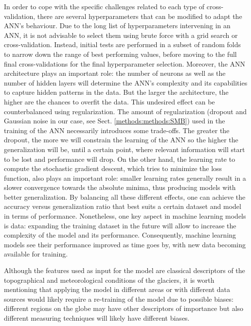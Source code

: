 In order to cope with the specific challenges related to each type of cross-validation, there are several hyperparameters that can be modified to adapt the ANN’s behaviour. Due to the long list of hyperparameters intervening in an ANN, it is not advisable to select them using brute force with a grid search or cross-validation. Instead, initial tests are performed in a subset of random folds to narrow down the range of best performing values, before moving to the full final cross-validations for the final hyperparameter selection. Moreover, the ANN architecture plays an important role: the number of neurons as well as the number of hidden layers will determine the ANN’s complexity and its capabilities to capture hidden patterns in the data. But the larger the architecture, the higher are the chances to overfit the data. This undesired effect can be counterbalanced using regularization. The amount of regularization (dropout and Gaussian noise in our case, see Sect. \ref{methods:methods:SMB}) used in the training of the ANN necessarily introduces some trade-offs. The greater the dropout, the more we will constrain the learning of the ANN so the higher the generalization will be, until a certain point, where relevant information will start to be lost and performance will drop. On the other hand, the learning rate to compute the stochastic gradient descent, which tries to minimize the loss function, also plays an important role: smaller learning rates generally result in a slower convergence towards the absolute minima, thus producing models with better generalization. By balancing all these different effects, one can achieve the accuracy versus generalization ratio that best suits a certain dataset and model in terms of performance. Nonetheless, one key aspect in machine learning models is data: expanding the training dataset in the future will allow to increase the complexity of the model and its performance. Consequently, machine learning models see their performance improved as time goes by, with new data becoming available for training. 

Although the features used as input for the model are classical descriptors of the topographical and meteorological conditions of the glaciers, it is worth mentioning that applying the model in different areas or with different data sources would likely require a re-training of the model due to possible biases: different regions on the globe may have other descriptors of importance but also different measuring techniques will likely have different biases. 

